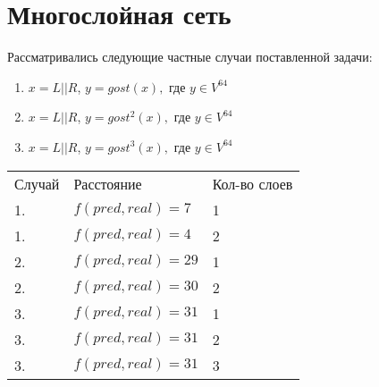 \documentclass[a4paper,12pt,twoside]{article}
\begin{document}
	\section{Многослойная сеть}
	\bigskip
	Рассматривались следующие частные случаи поставленной задачи:
	
	\begin{enumerate}
		\item $x = L || R$, $y=gost(x),$ где $y \in V^{64}$
		\item $x = L || R$, $y=gost^2(x),$ где $y \in V^{64}$
		\item $x = L || R$, $y=gost^3(x),$ где $y \in V^{64}$
	\end{enumerate}

		\begin{table}[ht!]
		\begin{tabular}{lll}
			Случай &  Расстояние & Кол-во слоев\\
			1. &  $f(pred, real) = 7$ & 1\\
			1. &  $f(pred, real) = 4$ & 2\\
			2. &  $f(pred, real) = 29$ & 1\\
			2. &  $f(pred, real) = 30$ & 2\\
			3. &  $f(pred, real) = 31$ & 1\\
			3. &  $f(pred, real) = 31$ & 2\\
			3. &  $f(pred, real) = 31$ & 3\\
		\end{tabular}
	\end{table}
	
\end{document}

